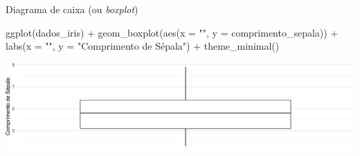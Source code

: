\documentclass[
  10pt,
  ignorenonframetext,
]{beamer}
\newenvironment{Shaded}{}{}
\newcommand{\DataTypeTok}[1]{#1}
\newcommand{\KeywordTok}[1]{\textcolor[rgb]{0.00,0.00,1.00}{#1}}
\newcommand{\NormalTok}[1]{#1}
\newcommand{\OperatorTok}[1]{#1}
\newcommand{\StringTok}[1]{\textcolor[rgb]{0.00,0.50,0.50}{#1}}
\begin{document}
\begin{frame}[fragile]{Diagrama de caixa (ou \emph{boxplot})}
\protect\hypertarget{diagrama-de-caixa-ou-boxplot-4}{}
\begin{Shaded}
\begin{Highlighting}[]
\KeywordTok{ggplot}\NormalTok{(dados\_iris) }\OperatorTok{+}
\StringTok{  }\KeywordTok{geom\_boxplot}\NormalTok{(}\KeywordTok{aes}\NormalTok{(}\DataTypeTok{x =} \StringTok{""}\NormalTok{, }\DataTypeTok{y =}\NormalTok{ comprimento\_sepala)) }\OperatorTok{+}
\StringTok{  }\KeywordTok{labs}\NormalTok{(}\DataTypeTok{x =} \StringTok{""}\NormalTok{, }\DataTypeTok{y =} \StringTok{"Comprimento de Sépala"}\NormalTok{) }\OperatorTok{+}
\StringTok{  }\KeywordTok{theme\_minimal}\NormalTok{()}
\end{Highlighting}
\end{Shaded}

\begin{center}\includegraphics[width=0.85\linewidth]{aulas_files/figure-beamer/unnamed-chunk-69-1} \end{center}
\end{frame}
\end{document}
